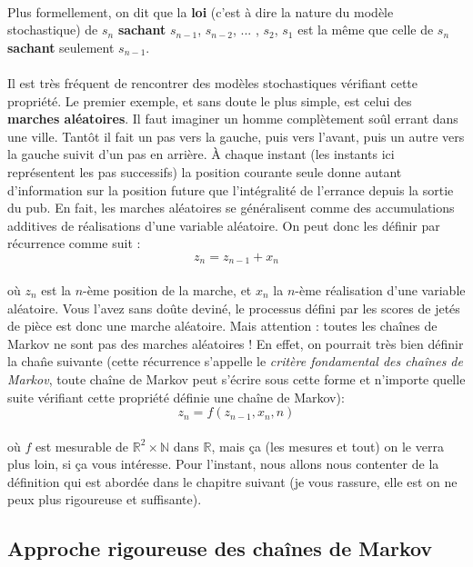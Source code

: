 \documentclass{article}
\begin{document}
\\
Plus formellement, on dit que la \textbf{loi} (c'est à dire la nature du modèle stochastique) de $s_n$ \textbf{sachant}  $s_{n-1}$, $s_{n-2}$, ... , $s_2$, $s_1$ est la m\^eme que celle de $s_n$ \textbf{sachant} seulement $s_{n-1}$.\\
\\
Il est très fréquent de rencontrer des modèles stochastiques vérifiant cette propriété. Le premier exemple, et sans doute le plus simple, est celui des \textbf{marches aléatoires}. Il faut imaginer un homme complètement so\^ul errant dans une ville. Tantôt il fait un pas vers la gauche, puis vers l'avant, puis un autre vers la gauche suivit d'un pas en arrière. À chaque instant (les instants ici représentent les pas successifs) la position courante seule donne autant d'information sur la position future que l'intégralité de l'errance depuis la sortie du pub. En fait, les marches aléatoires se généralisent comme des accumulations additives de réalisations d'une variable aléatoire. On peut donc les définir par récurrence  comme suit :
\[z_n = z_{n-1} + x_n\]   
\\
où $z_n$ est la $n$-ème position de la marche, et $x_n$ la $n$-ème réalisation d'une variable aléatoire. Vous l'avez sans do\^ute deviné, le processus défini par les scores de jetés de pièce est donc une marche aléatoire. Mais attention : toutes les cha\^ines de Markov ne sont pas des marches aléatoires ! En effet, on pourrait très bien définir la cha\^ne suivante (cette récurrence s'appelle le \textit{critère fondamental des cha\^ines de Markov}, toute cha\^ine de Markov peut s'écrire sous cette forme et n'importe quelle suite vérifiant cette propriété définie une cha\^ine de Markov): 
\[z_n = \mathit{f}(z_{n-1},x_n,n)\]
\\
où $\mathit{f}$ est mesurable de $\mathbb{R}^2\times\mathbb{N}$ dans $\mathbb{R}$, mais ça (les mesures et tout) on le verra plus loin, si ça vous intéresse. Pour l'instant, nous allons nous contenter de la définition qui est abordée dans le chapitre suivant (je vous rassure, elle est on ne peux plus rigoureuse et suffisante).

\newpage
\subsection{Approche rigoureuse des cha\^ ines de Markov}
\end{document}
